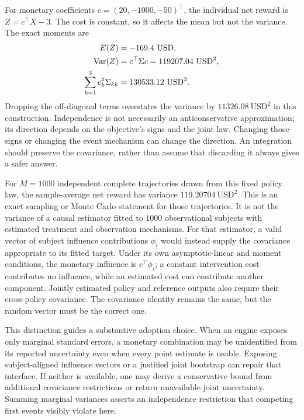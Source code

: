 For monetary coefficients $c=(20,-1000,-50)^\top$, the individual net reward
is $Z=c^\top X-3$. The cost is constant, so it affects the mean but not the
variance. The exact moments are
\begin{align}
 E(Z)&=-169.4\ \mathrm{USD},\notag\\
 \operatorname{Var}(Z)&=c^\top\Sigma c
                 =119207.04\ \mathrm{USD}^2,\notag\\
 \sum_{k=1}^3c_k^2\Sigma_{kk}&=130533.12\ \mathrm{USD}^2.
 \label{exec17:s5-joint-money}
\end{align}
Dropping the off-diagonal terms overstates the variance by
$11326.08\ \mathrm{USD}^2$ in this construction. Independence is not necessarily
an anticonservative approximation; its direction depends on the objective's
signs and the joint law. Changing those signs or changing the event mechanism
can change the direction. An integration should preserve the covariance,
rather than assume that discarding it always gives a safer answer.

For $M=1000$ independent complete trajectories drawn from this fixed policy
law, the sample-average net reward has variance $119.20704\ \mathrm{USD}^2$.
This is an exact sampling or Monte Carlo statement for those trajectories.
It is not the variance of a causal estimator fitted to $1000$ observational
subjects with estimated treatment and observation mechanisms. For that
estimator, a valid vector of subject influence contributions $\phi_i$ would
instead supply the covariance appropriate to its fitted target. Under its
own asymptotic-linear and moment conditions, the monetary influence is
$c^\top\phi_i$; a constant intervention cost contributes no influence, while
an estimated cost can contribute another component. Jointly estimated
policy and reference outputs also require their cross-policy covariance.
The covariance identity remains the same, but the random vector must be the
correct one.\citep{exec17_s5_joint_error}

This distinction guides a substantive adoption choice. When an engine exposes
only marginal standard errors, a monetary combination may be unidentified
from its reported uncertainty even when every point estimate is usable.
Exposing subject-aligned influence vectors or a justified joint bootstrap
can repair that interface. If neither is available, one may derive a
conservative bound from additional covariance restrictions or return
unavailable joint uncertainty. Summing marginal variances asserts an
independence restriction that competing first events visibly violate here.

